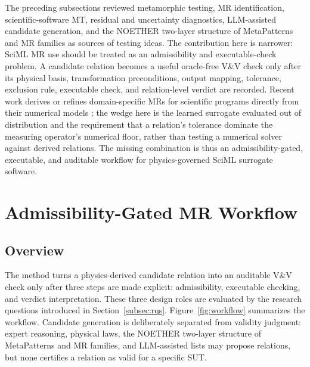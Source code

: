 \documentclass[preprint,12pt,authoryear]{elsarticle}
\begin{document}
The preceding subsections reviewed metamorphic testing, MR identification, scientific-software MT, residual and uncertainty diagnostics, LLM-assisted candidate generation, and the NOETHER two-layer structure of MetaPatterns and MR families as sources of testing ideas. The contribution here is narrower: SciML MR use should be treated as an admissibility and executable-check problem. A candidate relation becomes a useful oracle-free V\&V check only after its physical basis, transformation preconditions, output mapping, tolerance, exclusion rule, executable check, and relation-level verdict are recorded. Recent work derives or refines domain-specific MRs for scientific programs directly from their numerical models \citep{yan2024elliptic,stevens2025mars}; the wedge here is the learned surrogate evaluated out of distribution and the requirement that a relation's tolerance dominate the measuring operator's numerical floor, rather than testing a numerical solver against derived relations. The missing combination is thus an admissibility-gated, executable, and auditable workflow for physics-governed SciML surrogate software.

\section{Admissibility-Gated MR Workflow}
\label{sec:method}

\subsection{Overview}
\label{subsec:method-overview}

The method turns a physics-derived candidate relation into an auditable V\&V check only after three steps are made explicit: admissibility, executable checking, and verdict interpretation. These three design roles are evaluated by the research questions introduced in Section~\ref{subsec:rqs}. Figure~\ref{fig:workflow} summarizes the workflow. Candidate generation is deliberately separated from validity judgment: expert reasoning, physical laws, the NOETHER two-layer structure of MetaPatterns and MR families, and LLM-assisted lists may propose relations, but none certifies a relation as valid for a specific SUT.
\end{document}

